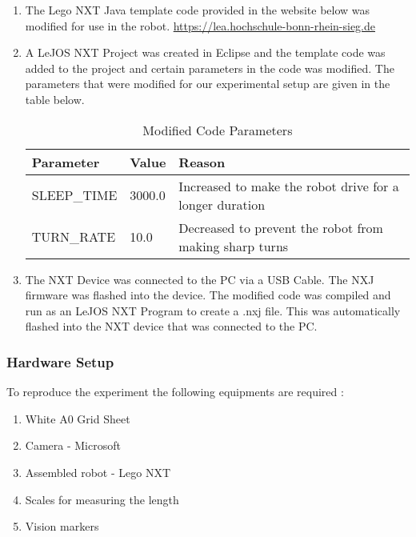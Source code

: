 			\begin{enumerate}
				\item
				The Lego NXT Java template code provided in the website below was modified for use in the robot.
				\href{https://lea.hochschule-bonn-rhein-sieg.de/ilias.php?ref_id=571436&cmd=view&cmdClass=ilrepositorygui&cmdNode=t3&baseClass=ilrepositorygui}{https://lea.hochschule-bonn-rhein-sieg.de}
				\item
				A LeJOS NXT Project was created in Eclipse and the template code was added to the project and certain parameters in the code was modified. The parameters that were modified for our experimental setup are given in the table below.				
					
				\begin{table}[ht]				
					\centering
				\begin{tabular}{ | C{3cm} | C{3cm}|  C{7cm} |} 
					\hline
					\textbf{Parameter} & \textbf{Value} & \textbf{Reason}\\ 
					\hline
					SLEEP\_TIME   & 3000.0 &  Increased to make the robot drive for a longer duration\\ 
					\hline
					TURN\_RATE  & 10.0 & Decreased to prevent the robot from making sharp turns\\ 
					\hline
				\end{tabular}
					\caption{Modified Code Parameters}
				  	\label{Tab:Tcr}
				\end{table}
		\item
		The NXT Device was connected to the PC via a USB Cable. The NXJ firmware was flashed into the device. The modified code was compiled and run as an LeJOS NXT Program to create a .nxj file. This was automatically flashed into the NXT device that was connected to the PC.
				
				
			\end{enumerate}
			
			
	
	\subsubsection{Hardware Setup}	
To reproduce the experiment the following equipments are required :
\begin{enumerate}
    \item
    White A0 Grid Sheet
    \item
    Camera - Microsoft 
    \item
    Assembled robot - Lego NXT 
    \item
    Scales for measuring the length 
    \item
    Vision markers
\end{enumerate}
\vspace{0.5cm}

